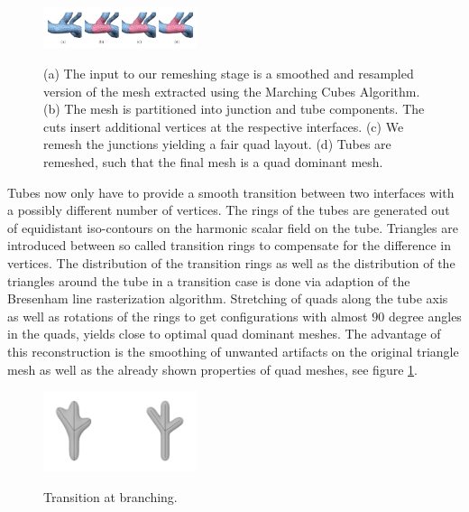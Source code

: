 \begin{figure}[h]
	\centering
	\includegraphics[width=0.4\textwidth]{./Images/Remeshing_stage.png} \\
	\caption{ (a) The input to our remeshing stage is a smoothed and resampled version of the mesh extracted using the Marching Cubes Algorithm. (b) The mesh is partitioned into junction and tube components. The cuts insert additional vertices at the respective interfaces. (c) We remesh the junctions yielding a fair quad layout. (d) Tubes are remeshed, such that the final mesh is a quad dominant mesh.}
	\cite{sibbing2012topology}
	\label{fig:Remeshing_stage}
\end{figure}

Tubes now only have to provide a smooth transition between two interfaces with a possibly different number of vertices. The rings of the tubes are generated out of equidistant iso-contours on the harmonic scalar field on the tube. Triangles are introduced between so called transition rings to compensate for the difference in vertices. The distribution of the transition rings as well as the distribution of the triangles around the tube in a transition case is done via adaption of the Bresenham line rasterization algorithm. Stretching of quads along the tube axis as well as rotations of the rings to get configurations with almost $90$ degree angles in the quads, yields close to optimal quad dominant meshes. The advantage of this reconstruction is the smoothing of unwanted artifacts on the original triangle mesh as well as the already shown properties of quad meshes, see figure \ref{fig:Remeshing_stage}.


\begin{figure}[h]
	\centering
	\includegraphics[width=0.4\textwidth]{./Images/Branching_ConvolutionSurfaces.png} \\
	\caption{Transition at branching.}
	\cite{oeltze2005visualization}
	\label{fig:Branching_ConvolutionSurfaces}
\end{figure}

